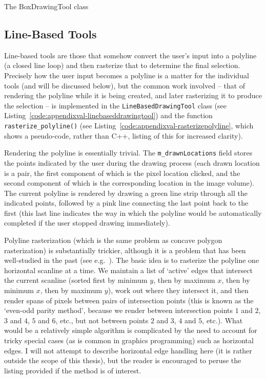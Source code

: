\begin{stulisting}[p]
\caption{The BoxDrawingTool class}
\label{code:appendixval-boxdrawingtool}

\end{stulisting}

\subsection{Line-Based Tools}

Line-based tools are those that somehow convert the user's input into a polyline (a closed line loop) and then rasterize that to determine the final selection. Precisely how the user input becomes a polyline is a matter for the individual tools (and will be discussed below), but the common work involved -- that of rendering the polyline while it is being created, and later rasterizing it to produce the selection -- is implemented in the \texttt{LineBasedDrawingTool} class (see Listing~\ref{code:appendixval-linebaseddrawingtool}) and the function \texttt{rasterize_polyline()} (see Listing~\ref{code:appendixval-rasterizepolyline}, which shows a pseudo-code, rather than C++, listing of this for increased clarity).

Rendering the polyline is essentially trivial. The \texttt{m_drawnLocations} field stores the points indicated by the user during the drawing process (each drawn location is a pair, the first component of which is the pixel location clicked, and the second component of which is the corresponding location in the image volume). The current polyline is rendered by drawing a green line strip through all the indicated points, followed by a pink line connecting the last point back to the first (this last line indicates the way in which the polyline would be automatically completed if the user stopped drawing immediately).

Polyline rasterization (which is the same problem as concave polygon rasterization) is substantially trickier, although it is a problem that has been well-studied in the past (see e.g.~\cite{heckbert90}). The basic idea is to rasterize the polyline one horizontal scanline at a time. We maintain a list of `active' edges that intersect the current scanline (sorted first by minimum $y$, then by maximum $x$, then by minimum $x$, then by maximum $y$), work out where they intersect it, and then render spans of pixels between pairs of intersection points (this is known as the `even-odd parity method', because we render between intersection points $1$ and $2$, $3$ and $4$, $5$ and $6$, etc., but not between points $2$ and $3$, $4$ and $5$, etc.). What would be a relatively simple algorithm is complicated by the need to account for tricky special cases (as is common in graphics programming) such as horizontal edges. I will not attempt to describe horizontal edge handling here (it is rather outside the scope of this thesis), but the reader is encouraged to peruse the listing provided if the method is of interest.

